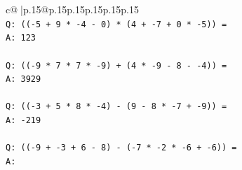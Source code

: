 \documentclass{article}
\begin{document}
{\begin{supertabular}{c@{$\;$}|p{.15\linewidth}@{}p{.15\linewidth}p{.15\linewidth}p{.15\linewidth}p{.15\linewidth}p{.15\linewidth}}
{{{\\ 
\texttt{Q: (({-}5 + 9 * {-}4 {-} 0) * (4 + {-}7 + 0 * {-}5)) =} \\
\texttt{A: 123} \\
\\ 
\texttt{Q: (({-}9 * 7 * 7 * {-}9) + (4 * {-}9 {-} 8 {-} {-}4)) =} \\
\texttt{A: 3929} \\
\\ 
\texttt{Q: (({-}3 + 5 * 8 * {-}4) {-} (9 {-} 8 * {-}7 + {-}9)) =} \\
\texttt{A: {-}219} \\
\\ 
\texttt{Q: (({-}9 + {-}3 + 6 {-} 8) {-} ({-}7 * {-}2 * {-}6 + {-}6)) =} \\
\texttt{A:} \\
            }
        }
    }
     \\ \\


\end{supertabular}}
\end{document}
